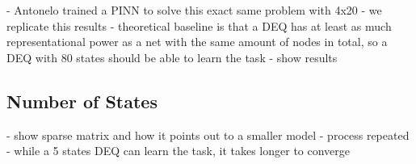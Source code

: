 - Antonelo trained a PINN to solve this exact same problem with 4x20
- we replicate this results
- theoretical baseline is that a DEQ has at least as much representational power as a net with the same amount of nodes in total, so a DEQ with 80 states should be able to learn the task
- show results

\subsection{Number of States}

- show sparse matrix and how it points out to a smaller model
- process repeated
- while a 5 states DEQ can learn the task, it takes longer to converge



